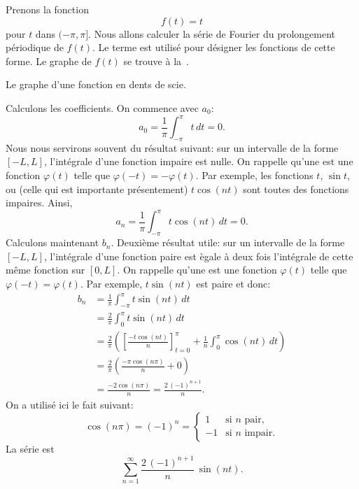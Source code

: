 \begin{example}
Prenons la fonction
\begin{equation*}
f(t) = t
\end{equation*}
pour $t$ dans $(-\pi,\pi]$. Nous allons calculer la série de Fourier du prolongement périodique de $f(t)$.  Le terme \emph{} est utilisé pour désigner les fonctions de cette forme.  Le graphe de $f(t)$ se trouve à la~.

\begin{myfig}
\capstart
{}
\caption{Le graphe d'une fonction en dents de scie.\label{ts:sawtoothfig}}
\end{myfig}
Calculons les coefficients. On commence avec  $a_0$: 
\begin{equation*}
a_0 = \frac{1}{\pi} \int_{-\pi}^\pi t \,dt = 0 .
\end{equation*}
Nous nous servirons souvent du résultat suivant: sur un intervalle de la forme $[-L,L]$,  l'intégrale d'une fonction impaire est nulle. On rappelle qu'une 
\emph{} est une fonction 
 $\varphi(t)$ telle que $\varphi(-t) = -\varphi(t)$.  Par exemple, les fonctions $t$, $\sin t$, ou (celle qui est importante présentement)
$t \cos (nt)$ sont toutes des fonctions impaires.  Ainsi,
\begin{equation*}
a_n = \frac{1}{\pi} \int_{-\pi}^\pi t \cos (nt) \,dt = 0 .
\end{equation*}
Calculons maintenant $b_n$.  Deuxième résultat utile: sur un intervalle de la forme $[-L,L]$, l'intégrale d'une fonction paire est ègale à deux fois l'intégrale de cette même fonction sur $[0,L]$. On rappelle qu'une  \emph{}
est une fonction $\varphi(t)$ telle que  $\varphi(-t) = \varphi(t)$.  Par exemple,
$t \sin (nt)$ est paire et donc: 
\begin{equation*}
\begin{split}
b_n & = \frac{1}{\pi} \int_{-\pi}^\pi t \sin (nt) \,dt \\
& = \frac{2}{\pi} \int_{0}^\pi t \sin (nt) \,dt \\
& = \frac{2}{\pi} \left(
\left[ \frac{-t \cos (nt)}{n} \right]_{t=0}^{\pi}
+
\frac{1}{n}
\int_{0}^\pi \cos (nt) \,dt
\right)
\\
& = \frac{2}{\pi} \left(
\frac{-\pi \cos (n\pi)}{n}
+
0
\right) \\
& =  \frac{-2 \cos (n\pi)}{n}
=  \frac{2 \,{(-1)}^{n+1}}{n} .
\end{split}
\end{equation*}
On a utilisé ici le fait suivant:  
\begin{equation*}
\cos (n\pi) = {(-1)}^n =
\begin{cases}
1 & \text{si } n \text{ pair} , \\
-1 & \text{si } n \text{ impair} .
\end{cases}
\end{equation*}
La série est
\begin{equation*}
\sum_{n=1}^\infty
\frac{2 \,{(-1)}^{n+1}}{n} \,
\sin (n t) .
\end{equation*}


\end{example}

